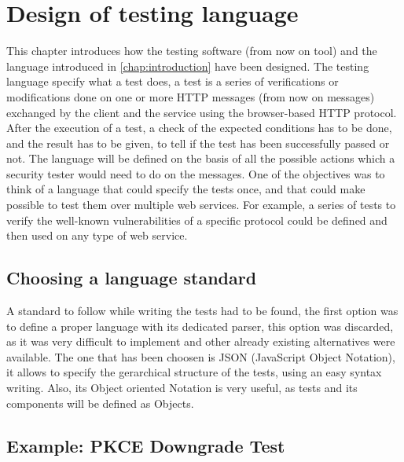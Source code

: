 \chapter{Design of testing language}
\label{chap:Design}
This chapter introduces how the testing software (from now on tool) and the language introduced in \ref{chap:introduction} have been designed. The testing language specify what a test does, a test is a series of verifications or modifications done on one or more HTTP messages (from now on messages) exchanged by the client and the service using the browser-based HTTP protocol. After the execution of a test, a check of the expected conditions has to be done, and the result has to be given, to tell if the test has been successfully passed or not. The language will be defined on the basis of all the possible actions which a security tester would need to do on the messages. 
One of the objectives was to think of a language that could specify the tests once, and that could make possible to test them over multiple web services. For example, a series of tests to verify the well-known vulnerabilities of a specific protocol could be defined and then used on any type of web service.

\section{Choosing a language standard}
A standard to follow while writing the tests had to be found, the first option was to define a proper language with its dedicated parser, this option was discarded, as it was very difficult to implement and other already existing alternatives were available. The one that has been choosen is JSON (JavaScript Object Notation), it allows to specify the gerarchical structure of the tests, using an easy syntax writing. Also, its Object oriented Notation is very useful, as tests and its components will be defined as Objects.

\section{Example: PKCE Downgrade Test}
\label{sec:pkce_downgrade}

